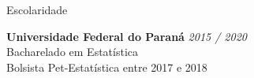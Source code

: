 \documentclass{resume} %
\begin{document}

\begin{rSection}{Escolaridade}

{\bf Universidade Federal do Paraná} \hfill {\em 2015 / 2020} \\ 
Bacharelado em Estatística \\
Bolsista Pet-Estatística entre 2017 e 2018 \\

\end{rSection}

\end{document}
